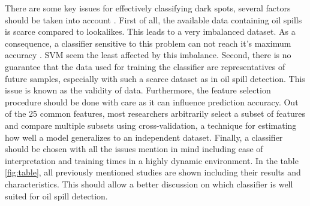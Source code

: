 There are some key issues for effectively classifying dark spots, several factors should be taken into account \cite{Kubat:1998:MLD:288808.288812}. First of all, the available data containing oil spills is scarce compared to lookalikes. This leads to a very imbalanced dataset. As a consequence, a classifier sensitive to this problem can not reach it's maximum accuracy \cite{Japkowicz20026}. SVM seem the least affected by this imbalance. Second, there is no guarantee that the data used for training the classifier are representatives of future samples, especially with such a scarce dataset as in oil spill detection. This issue is known as the validity of data. Furthermore, the feature selection procedure should be done with care as it can influence prediction accuracy. Out of the 25 common features, most researchers arbitrarily select a subset of features and compare multiple subsets using cross-validation, a technique for estimating how well a model generalizes to an independent dataset. Finally, a classifier should be chosen with all the issues mention in mind including ease of interpretation and training times in a highly dynamic environment. In the table \ref{fig:table}, all previously mentioned studies are shown including their results and characteristics. This should allow a better discussion on which classifier is well suited for oil spill detection.

